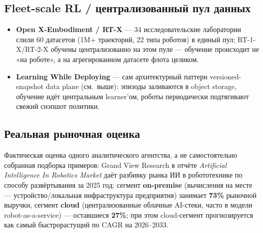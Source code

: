 \documentclass[11pt]{article}
\begin{document}
\subsection*{Fleet-scale RL / централизованный пул данных}
\begin{itemize}
  \item \textbf{Open X-Embodiment / RT-X} \cite{openxembodiment2023} — 34
        исследовательские лаборатории слили 60 датасетов (1M+ траекторий, 22 типа
        роботов) в единый пул; RT-1-X/RT-2-X обучены централизованно на этом пуле —
        обучение происходит не «на роботе», а на агрегированном датасете флота
        целиком.
  \item \textbf{Learning While Deploying} \cite{fleetscale2026} — сам архитектурный
        паттерн versioned-snapshot data plane (см.\ выше): эпизоды заливаются в
        object storage, обучение идёт центральным learner'ом, роботы периодически
        подтягивают свежий снэпшот политики.
\end{itemize}

\subsection*{Реальная рыночная оценка}

Фактическая оценка одного аналитического агентства, а не самостоятельно собранная
подборка примеров: Grand View Research в отчёте \emph{Artificial
Intelligence In Robotics Market} \cite{gvrairobotics2025} даёт разбивку рынка ИИ в
робототехнике по способу развёртывания за 2025 год: сегмент
\textbf{on-premise} (вычисления на месте — устройство/локальная инфраструктура
предприятия) занимает \textbf{73\%} рыночной выручки, сегмент
\textbf{cloud} (централизованные облачные AI-стеки, часто в модели
robot-as-a-service) — оставшиеся \textbf{27\%}; при этом cloud-сегмент прогнозируется
как самый быстрорастущий по CAGR на 2026--2033.

\begin{center}
\\[4pt]
\end{center}
\end{document}
